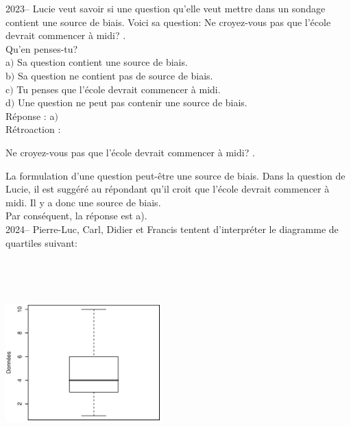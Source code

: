 \documentclass[letterpaper, 12pt]{article}
\begin{document}
2023-- Lucie veut savoir si une question qu'elle veut mettre dans un sondage contient une source de biais. Voici sa question: \og Ne croyez-vous pas que l'\'ecole devrait commencer \`a midi?  \fg.\\
Qu'en penses-tu? \\

a$)$ Sa question contient une source de biais.\\
b$)$ Sa question ne contient pas de source de biais.\\
c$)$ Tu penses que l'\'ecole devrait commencer \`a midi.\\
d$)$ Une question ne peut pas contenir une source de biais.\\

R\'eponse : a$)$\\

R\'etroaction :
\begin{center}
 \og Ne croyez-vous pas que l'\'ecole devrait commencer \`a midi?  \fg.
\end{center}
La formulation d'une question peut-\^etre une source de biais. Dans la question de Lucie, il est sugg\'er\'e au r\'epondant qu'il croit que l'\'ecole devrait commencer \`a midi. Il y a donc une source de biais. \\
Par cons\'equent, la r\'eponse est a).\\


2024-- Pierre-Luc, Carl, Didier et Francis tentent d'interpr\'eter le diagramme de quartiles suivant:
\begin{center}
 \includegraphics[width=6cm,height=8cm,angle=-90]{Q2024.eps}
\end{center}
\end{document}
